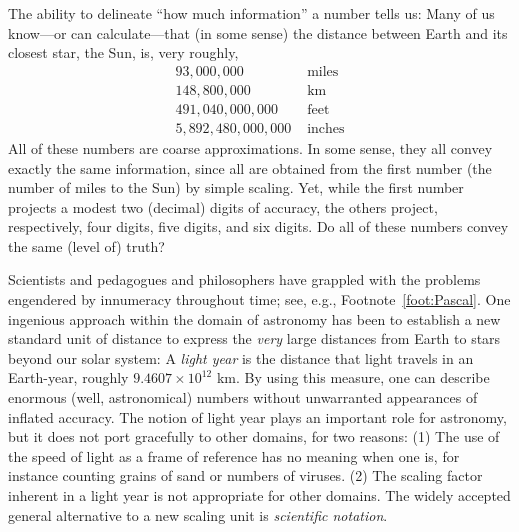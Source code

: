The ability to delineate ``how much information'' a number tells us:
Many of us know---or can calculate---that (in some sense) the distance
between Earth and its closest star, the Sun, is, very roughly,
\[ \begin{array}{rl}
93,000,000 & \mbox{ miles} \\
148,800,000 & \mbox{ km} \\
491,040,000,000 & \mbox{ feet} \\
5,892,480,000,000 & \mbox{ inches}
\end{array}
\]
All of these numbers are coarse approximations.  In some sense, they
all convey exactly the same information, since all are obtained from
the first number (the number of miles to the Sun) by simple scaling.
Yet, while the first number projects a modest two (decimal) digits of
accuracy, the others project, respectively, four digits, five digits,
and six digits.  Do all of these numbers convey the same (level of)
truth?

\medskip

Scientists and pedagogues and philosophers have grappled with the
problems engendered by innumeracy throughout time; see, e.g.,
Footnote~\ref{foot:Pascal}.  One ingenious approach within the domain
of astronomy has been to establish a new standard unit of distance to
express the {\em very} large distances from Earth to stars beyond our
solar system: A {\em light year} is the distance that light travels in
an Earth-year, roughly $9.4607 \times 10^{12}$ km.  By using this
measure, one can describe enormous (well, astronomical) numbers
without unwarranted appearances of inflated accuracy.  The notion of
light year plays an important role for astronomy, but it does not port
gracefully to other domains, for two reasons: (1) The use of the speed
of light as a frame of reference has no meaning when one is, for
instance counting grains of sand or numbers of viruses.  (2) The
scaling factor inherent in a light year is not appropriate for other
domains.  The widely accepted general alternative to a new scaling
unit is {\em scientific notation}.  

